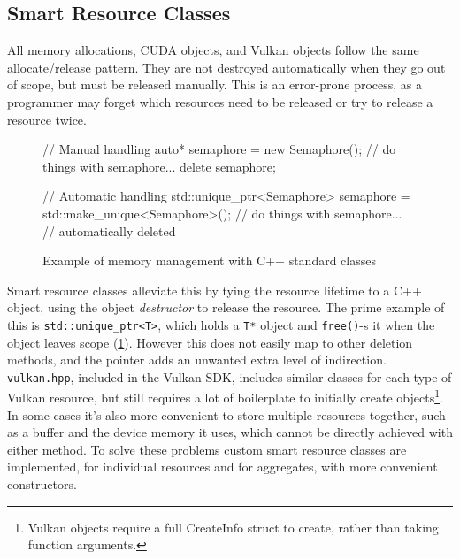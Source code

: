 \subsection{Smart Resource Classes}
All memory allocations, CUDA objects, and Vulkan objects follow the same allocate/release pattern.
They are not destroyed automatically when they go out of scope, but must be released manually.
This is an error-prone process, as a programmer may forget which resources need to be released or try to release a resource twice.

\begin{figure}
    \centering
    \begin{cppcode}
// Manual handling
{
    auto* semaphore = new Semaphore();
    // do things with semaphore...
    delete semaphore;
}

// Automatic handling
{
    std::unique_ptr<Semaphore> semaphore = std::make_unique<Semaphore>();
    // do things with semaphore...
    // automatically deleted
}
    \end{cppcode}
    \caption{Example of memory management with C++ standard classes}
    \label{fig:ImplUniquePtr}
\end{figure}

Smart resource classes alleviate this by tying the resource lifetime to a C++ object, using the object \emph{destructor} to release the resource.
The prime example of this is \texttt{std::unique_ptr<T>}, which holds a \texttt{T*} object and \texttt{free()}-s it when the object leaves scope (\cref{fig:ImplUniquePtr}).
However this does not easily map to other deletion methods, and the pointer adds an unwanted extra level of indirection.
\texttt{vulkan.hpp}, included in the Vulkan SDK, includes similar classes for each type of Vulkan resource, but still requires a lot of boilerplate to initially create objects\footnote{Vulkan objects require a full CreateInfo struct to create, rather than taking function arguments.}.
In some cases it's also more convenient to store multiple resources together, such as a buffer and the device memory it uses, which cannot be directly achieved with either method.
To solve these problems custom smart resource classes are implemented, for individual resources and for aggregates, with more convenient constructors.

